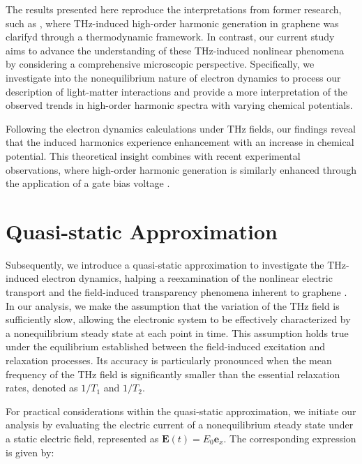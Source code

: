 The results presented here reproduce the interpretations from former research, such as \cite{mics2015thermodynamic}, where THz-induced high-order harmonic generation in graphene was clarifyd through a thermodynamic framework. In contrast, our current study aims to advance the understanding of these THz-induced nonlinear phenomena by considering a comprehensive microscopic perspective. Specifically, we investigate into the nonequilibrium nature of electron dynamics to process our description of light-matter interactions and provide a more  interpretation of the observed trends in high-order harmonic spectra with varying chemical potentials.

Following the electron dynamics calculations under THz fields, our findings reveal that the induced harmonics experience enhancement with an increase in chemical potential. This theoretical insight combines with recent experimental observations, where high-order harmonic generation is similarly enhanced through the application of a gate bias voltage \cite{kovalev2021electrical}.
\section{Quasi-static Approximation}
Subsequently, we introduce a quasi-static approximation to investigate the THz-induced electron dynamics, halping a reexamination of the nonlinear electric transport and the field-induced transparency phenomena inherent to graphene \cite{sato2021nonlinear}.
In our analysis, we make the assumption that the variation of the THz field is sufficiently slow, allowing the electronic system to be effectively characterized by a nonequilibrium steady state at each point in time. This assumption holds true under the equilibrium established between the field-induced excitation and relaxation processes. Its accuracy is particularly pronounced when the mean frequency of the THz field is significantly smaller than the essential relaxation rates, denoted as $1/T_1$ and $1/T_2$.

For practical considerations within the quasi-static approximation, we initiate our analysis by evaluating the electric current of a nonequilibrium steady state under a static electric field, represented as $\mathbf E(t)=E_0 \mathbf e_x$. The corresponding expression is given by:

